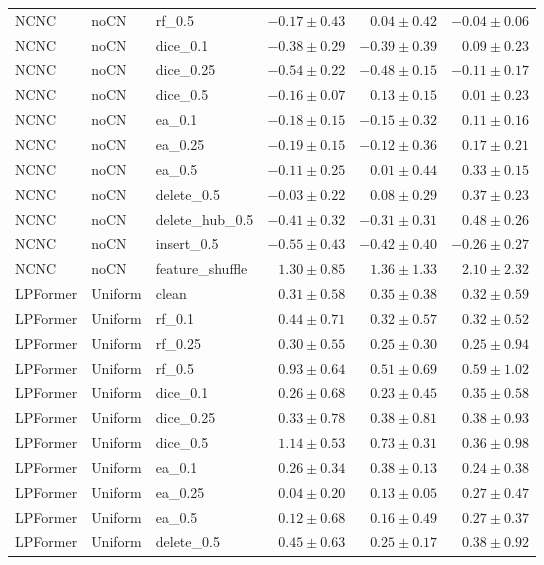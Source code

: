 \documentclass[UTF8,a4paper,11pt,fontset=fandol]{ctexart}
\begin{document}
{\begin{longtable}{lllrrr}
NCNC & noCN & rf\_0.5 & $-0.17\pm0.43$ & $0.04\pm0.42$ & $-0.04\pm0.06$ \\
NCNC & noCN & dice\_0.1 & $-0.38\pm0.29$ & $-0.39\pm0.39$ & $0.09\pm0.23$ \\
NCNC & noCN & dice\_0.25 & $-0.54\pm0.22$ & $-0.48\pm0.15$ & $-0.11\pm0.17$ \\
NCNC & noCN & dice\_0.5 & $-0.16\pm0.07$ & $0.13\pm0.15$ & $0.01\pm0.23$ \\
NCNC & noCN & ea\_0.1 & $-0.18\pm0.15$ & $-0.15\pm0.32$ & $0.11\pm0.16$ \\
NCNC & noCN & ea\_0.25 & $-0.19\pm0.15$ & $-0.12\pm0.36$ & $0.17\pm0.21$ \\
NCNC & noCN & ea\_0.5 & $-0.11\pm0.25$ & $0.01\pm0.44$ & $0.33\pm0.15$ \\
NCNC & noCN & delete\_0.5 & $-0.03\pm0.22$ & $0.08\pm0.29$ & $0.37\pm0.23$ \\
NCNC & noCN & delete\_hub\_0.5 & $-0.41\pm0.32$ & $-0.31\pm0.31$ & $0.48\pm0.26$ \\
NCNC & noCN & insert\_0.5 & $-0.55\pm0.43$ & $-0.42\pm0.40$ & $-0.26\pm0.27$ \\
NCNC & noCN & feature\_shuffle & $1.30\pm0.85$ & $1.36\pm1.33$ & $2.10\pm2.32$ \\
LPFormer & Uniform & clean & $0.31\pm0.58$ & $0.35\pm0.38$ & $0.32\pm0.59$ \\
LPFormer & Uniform & rf\_0.1 & $0.44\pm0.71$ & $0.32\pm0.57$ & $0.32\pm0.52$ \\
LPFormer & Uniform & rf\_0.25 & $0.30\pm0.55$ & $0.25\pm0.30$ & $0.25\pm0.94$ \\
LPFormer & Uniform & rf\_0.5 & $0.93\pm0.64$ & $0.51\pm0.69$ & $0.59\pm1.02$ \\
LPFormer & Uniform & dice\_0.1 & $0.26\pm0.68$ & $0.23\pm0.45$ & $0.35\pm0.58$ \\
LPFormer & Uniform & dice\_0.25 & $0.33\pm0.78$ & $0.38\pm0.81$ & $0.38\pm0.93$ \\
LPFormer & Uniform & dice\_0.5 & $1.14\pm0.53$ & $0.73\pm0.31$ & $0.36\pm0.98$ \\
LPFormer & Uniform & ea\_0.1 & $0.26\pm0.34$ & $0.38\pm0.13$ & $0.24\pm0.38$ \\
LPFormer & Uniform & ea\_0.25 & $0.04\pm0.20$ & $0.13\pm0.05$ & $0.27\pm0.47$ \\
LPFormer & Uniform & ea\_0.5 & $0.12\pm0.68$ & $0.16\pm0.49$ & $0.27\pm0.37$ \\
LPFormer & Uniform & delete\_0.5 & $0.45\pm0.63$ & $0.25\pm0.17$ & $0.38\pm0.92$ \\

\end{longtable}}
\end{document}
